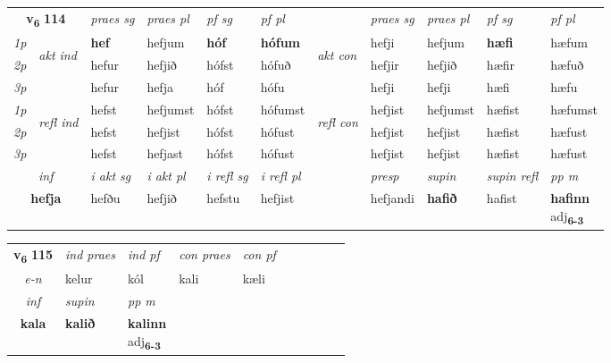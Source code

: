 \noindent
\begin{tabular}{lllllllllll} \toprule
\multicolumn{2}{c}{\textbf{v{\textsubscript{6}}} \Large{\textbf{114}}}  &  \textit{praes sg}  & \textit{praes pl}  &\textit{ pf sg} & \textit{pf pl} &  &  \textit{praes sg}  & \textit{praes pl}  & \textit{pf sg} & \textit{pf pl } \\*
	\cmidrule{3-6} \cmidrule{8-11}
 {\textit{1p}} & \multirow{3}{*}{\begin{turn}{90}\textit{akt ind}\end{turn}} & \textbf{hef} & hefjum & \textbf{hóf} & \textbf{hófum} & \multirow{3}{*}{\begin{turn}{90}\textit{akt con}\end{turn}} &hefji & hefjum & \textbf{hæfi} & hæfum\\*
 {\textit{2p}} &  &  hefur  & hefjið & hófst & hófuð & & hefjir & hefjið & hæfir & hæfuð \\*
{\textit{3p}} &  & hefur & hefja & hóf & hófu & & hefji & hefji& hæfi & hæfu \\*
\cmidrule{3-6} \cmidrule{8-11}
 {\textit{1p}} & \multirow{3}{*}{\begin{turn}{90}\textit{refl ind}\end{turn}}  & hefst & hefjumst & hófst & hófumst & \multirow{3}{*}{\begin{turn}{90}\textit{refl con}\end{turn}}  &hefjist & hefjumst & hæfist & hæfumst \\*
 {\textit{2p}} &  & hefst & hefjist & hófst & hófust & &hefjist & hefjist & hæfist & hæfust \\*
 {\textit{3p}}  & & hefst & hefjast & hófst & hófust & & hefjist & hefjist& hæfist & hæfust \\*
\cmidrule{3-6} \cmidrule{8-11}

   \multicolumn{2}{c}{\textit{inf}}  & \textit{i akt sg} & \textit{i akt pl} & \textit{i refl sg} & \textit{i refl pl} && \textit{presp} & \textit{supin} & \textit{supin refl} & \textit{pp m} \\*
  \multicolumn{2}{c}{\textbf{hefja}} & hefðu  & hefjið & hefstu & hefjist && hefjandi &  \textbf{hafið} & hafist & \specialcell{\textbf{hafinn} \\ adj\textbf{\textsubscript{6-3}}} \\*
\end{tabular}

\noindent
\begin{tabular}{lllllllllll} \toprule
\multicolumn{2}{c}{\textbf{v{\textsubscript{6}}} \Large{\textbf{115}}}  &  \textit{ind praes} & \textit{ind pf} & \textit{con praes} & \textit{con pf} \\*
\multicolumn{2}{c}{ \textit{e-n} } & kelur & kól & kali & kæli \\*

\cmidrule{3-4}
   \multicolumn{2}{c}{\textit{inf}}      & \textit{supin}  & \textit{pp m} \\*
  \multicolumn{2}{c}{\textbf{kala}}       &  \textbf{kalið}  & \specialcell{\textbf{kalinn} \\ adj\textbf{\textsubscript{6-3}}} \\*
\end{tabular}

